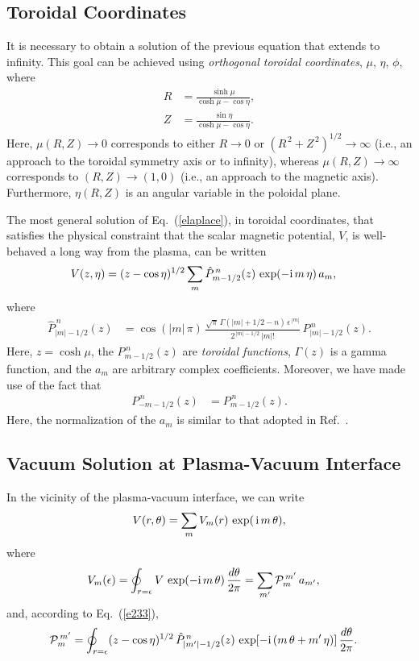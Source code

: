 \documentclass[12pt,prb,aps]{revtex4-1}
\begin{document}
\subsection{Toroidal Coordinates}
It is necessary to obtain a solution of the previous equation that extends to infinity. This goal can be achieved using {\em orthogonal toroidal coordinates}, $\mu$, $\eta$, $\phi$, 
where\,\cite{morse}
\begin{align}\label{e54cx}
R &= \frac{\sinh\mu}{\cosh\mu-\cos\eta},\\[0.5ex]
Z&= \frac{\sin\eta}{\cosh\mu-\cos\eta}.\label{e55cc}
\end{align}
Here, $\mu(R,Z)\rightarrow 0$ corresponds to either $R\rightarrow 0$ or $(R^{\,2}+Z^{\,2})^{1/2}\rightarrow\infty$ (i.e.,
an approach to the toroidal symmetry axis or to infinity), whereas $\mu(R,Z)\rightarrow \infty$
corresponds to $(R, Z) \rightarrow (1, 0)$ (i.e., an approach to the magnetic axis). Furthermore, $\eta(R,Z)$ is an angular variable in the poloidal
plane. 

 The most general solution of Eq.~(\ref{elaplace}), in toroidal coordinates, that satisfies the physical constraint that the scalar magnetic
 potential, $V$,    is well-behaved a long way from the plasma, can be written\,\cite{morse1}
\begin{align}\label{e233}
V(z,\eta) &=
(z-\cos\eta)^{1/2}\sum_{m} \hat{P}_{m-1/2}^{\,n}(z) \,\exp(-{\rm i}\,m\,\eta)\,a_m,
\end{align}
where
\begin{align}
\hat{P}_{|m|-1/2}^{\,n}(z) &= \cos(|m|\,\pi)\,\frac{\sqrt{\pi}\,\Gamma(|m|+1/2-n)\,\epsilon^{\,|m|}}{2^{\,|m|-1/2}\,|m|!}\,P_{|m|-1/2}^{\,n}(z).
\end{align}
Here,  $z=\cosh\mu$, the $P_{m-1/2}^{\,n}(z)$ are {\em toroidal functions},\cite{abrama}  $\Gamma(z)$ is a
gamma function,\cite{abramb} and the $a_m$ are arbitrary complex coefficients.
Moreover, we have made use of the fact that\,\cite{abrama}
\begin{align}
P_{-m-1/2}^{\,n}(z) &= P_{m-1/2}^{\,n}(z).
\end{align}
Here, the normalization of the $a_m$ is similar to that adopted in Ref.~.

\subsection{Vacuum Solution at Plasma-Vacuum Interface}\label{prdef}
In the vicinity of the plasma-vacuum interface, we can write
\begin{equation}\label{e193tt}
V(r,\theta) = \sum_m V_m(r)\,\exp(\,{\rm i}\,m\,\theta),
\end{equation}
where
\begin{align}\label{e344}
V_m (\epsilon)&= \oint_{r=\epsilon}V\,\exp(-{\rm i}\,m\,\theta)\,\frac{d\theta}{2\pi}= \sum_{m'}{\cal P}_m^{\,m'}\,a_{m'},
\end{align}
and, according to Eq.~(\ref{e233}), 
\begin{align}
{\cal P}_m^{\,m'} &=
\oint_{r=\epsilon}(z-\cos\eta)^{1/2}\,\hat{P}_{|m'|-1/2}^{\,n}(z)\,\exp[-{\rm i}\,(m\,\theta+m'\,\eta)]\,\frac{d\theta}{2\pi}.\label{e346}
\end{align}
\end{document}
